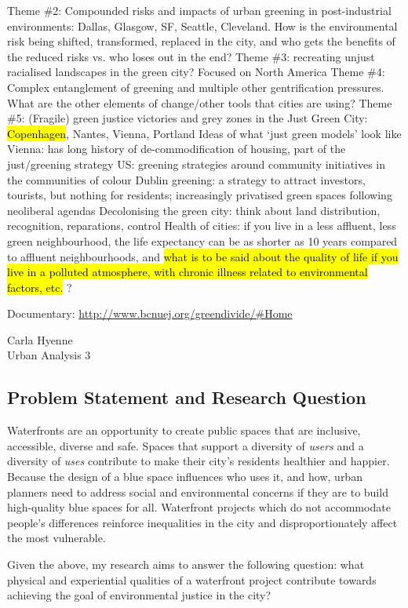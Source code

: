 \documentclass{article}
\begin{document}
\begin{outline}
	\1 Theme \#2: Compounded risks and impacts of urban greening in post-industrial environments: Dallas, Glasgow, SF, Seattle, Cleveland. How is the environmental risk being shifted, transformed, replaced in the city, and who gets the benefits of the reduced risks vs. who loses out in the end?
	\1 Theme \#3: recreating unjust racialised landscapes in the green city? Focused on North America
	\1 Theme \#4: Complex entanglement of greening and multiple other gentrification pressures. What are the other elements of change/other tools that cities are using?
	\1 Theme \#5: (Fragile) green justice victories and grey zones in the Just Green City: \hl{Copenhagen}, Nantes, Vienna, Portland
		\2 Ideas of what `just green models' look like
		\2 Vienna: has long history of de-commodification of housing, part of the just/greening strategy
		\2 US: greening strategies around community initiatives in the communities of colour
	\1 Dublin greening: a strategy to attract investors, tourists, but nothing for residents; increasingly privatised green spaces following neoliberal agendas
	\1 Decolonising the green city: think about land distribution, recognition, reparations, control
	\1 Health of cities: if you live in a less affluent, less green neighbourhood, the life expectancy can be as shorter as 10 years compared to affluent neighbourhoods, and \hl{what is to be said about the quality of life if you live in a polluted atmosphere, with chronic illness related to environmental factors, etc.}
	?
\end{outline}

Documentary: \url{http://www.bcnuej.org/greendivide/#Home}



\pagebreak

\begin{flushright}
Carla Hyenne\\
Urban Analysis 3
\end{flushright}

\subsection{Problem Statement and Research Question}

Waterfronts are an opportunity to create public spaces that are inclusive, accessible, diverse and safe. Spaces that support a diversity of \textit{users} and a diversity of \textit{uses} contribute to make their city's residents healthier and happier.
Because the design of a blue space influences who uses it, and how, urban planners need to address social and environmental concerns if they are to build high-quality blue spaces for all.
Waterfront projects which do not accommodate people's differences reinforce inequalities in the city and disproportionately affect the most vulnerable.

Given the above, my research aims to answer the following question: what physical and experiential qualities of a waterfront project contribute towards achieving the goal of environmental justice in the city?

\pagebreak

\printbibliography
\end{document}
